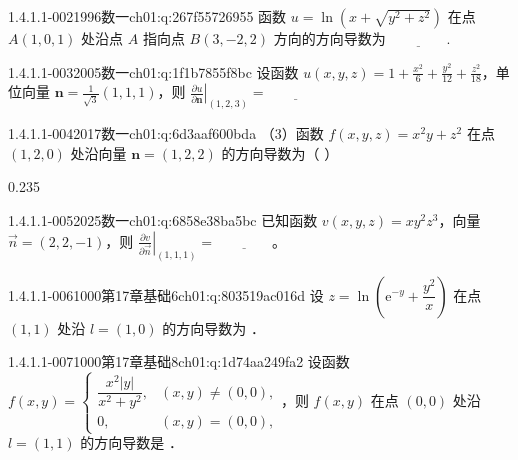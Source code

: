 \begin{q}{1.4.1.1-002}{1996数一}{ch01:q:267f55726955}
函数 $u=\ln(x+\sqrt{y^2+z^2})$ 在点 $A(1,0,1)$ 处沿点 $A$ 指向点 $B(3,-2,2)$ 方向的方向导数为 $\underline{\hspace{4em}}$.
\end{q}

\begin{q}{1.4.1.1-003}{2005数一}{ch01:q:1f1b7855f8bc}
设函数 $u(x,y,z)=1+\frac{x^2}{6}+\frac{y^2}{12}+\frac{z^2}{18}$，单位向量 $\mathbf{n}=\frac{1}{\sqrt{3}}(1,1,1)$，则 $\left.\frac{\partial u}{\partial \mathbf{n}}\right|_{(1,2,3)} = \underline{\hspace{4em}}$
\end{q}

\begin{q}{1.4.1.1-004}{2017数一}{ch01:q:6d3aaf600bda}
（3）函数 $f(x,y,z)=x^2y+z^2$ 在点 $(1,2,0)$ 处沿向量 $\mathbf{n}=(1,2,2)$ 的方向导数为（ ）
\begin{opts}{0.235}
\hfill{}\hfill{}\hfill{}
\end{opts}
\end{q}

\begin{q}{1.4.1.1-005}{2025数一}{ch01:q:6858e38ba5bc}
已知函数 $v(x,y,z)=xy^2z^3$，向量 $\vec{n}=(2,2,-1)$，则 $\left.\frac{\partial v}{\partial \vec{n}}\right|_{(1,1,1)}=\underline{\hspace{4em}}$。
\end{q}

\begin{q}{1.4.1.1-006}{1000第17章基础6}{ch01:q:803519ac016d}
设 $z=\ln\left(\mathrm{e}^{-y}+\dfrac{y^2}{x}\right)$ 在点 $(1,1)$ 处沿 $l=(1,0)$ 的方向导数为 \underline{\hspace{4em}}．
\end{q}

\begin{q}{1.4.1.1-007}{1000第17章基础8}{ch01:q:1d74aa249fa2}
设函数 $f(x,y)=\begin{cases}\dfrac{x^2|y|}{x^2+y^2}, & (x,y)\neq(0,0),\\ 0, & (x,y)=(0,0),\end{cases}$，则 $f(x,y)$ 在点 $(0,0)$ 处沿 $l=(1,1)$ 的方向导数是 \underline{\hspace{4em}}．
\end{q}

